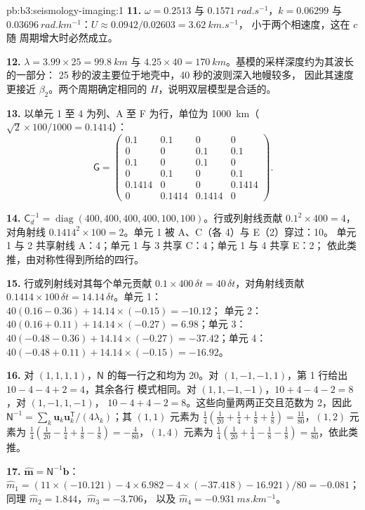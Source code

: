 \begin{solution}{pb:b3:seismology-imaging:1}
\textbf{11.} $\omega = 0.2513$ 与 $\qty{0.1571}{rad.s^{-1}}$，$k = 0.06299$ 与
$\qty{0.03696}{rad.km^{-1}}$：$U \approx 0.0942/0.02603 = \qty{3.62}{km.s^{-1}}$，
小于两个相速度，这在 $c$ 随
周期增大时必然成立。

\textbf{12.} $\lambda = 3.99\times25 = \qty{99.8}{km}$ 与 $4.25\times40 =
\qty{170}{km}$。基模的采样深度约为其波长的一部分：
25 秒的波主要位于地壳中，40 秒的波则深入地幔较多，
因此其速度更接近 $\beta_2$。两个周期确定相同的
$H$，说明双层模型是合适的。

\textbf{13.} 以单元 1 至 4 为列、A 至 F 为行，单位为
\qty{1000}{km}（$\sqrt2\times100/1000 = 0.1414$）：
\[
  \mathsf G = \begin{pmatrix}
  0.1 & 0.1 & 0 & 0 \\ 0 & 0 & 0.1 & 0.1 \\ 0.1 & 0 & 0.1 & 0 \\
  0 & 0.1 & 0 & 0.1 \\ 0.1414 & 0 & 0 & 0.1414 \\ 0 & 0.1414 & 0.1414 & 0
  \end{pmatrix}.
\]

\textbf{14.} $\mathsf C_d^{-1} = \operatorname{diag}(400, 400, 400, 400, 100,
100)$。行或列射线贡献 $0.1^2\times400 = 4$，对角射线
$0.1414^2\times100 = 2$。单元 1 被 A、C（各 4）与 E（2）穿过：10。
单元 1 与 2 共享射线 A：4；单元 1 与 3 共享 C：4；单元 1 与 4 共享 E：2；
依此类推，由对称性得到所给的四行。

\textbf{15.} 行或列射线对其每个单元贡献 $0.1\times400\,\delta t = 40\,
\delta t$，对角射线贡献 $0.1414\times100\,\delta t =
14.14\,\delta t$。单元 1：$40(0.16 - 0.36) + 14.14\times(-0.15) = -10.12$；
单元 2：$40(0.16 + 0.11) + 14.14\times(-0.27) = 6.98$；单元 3：$40(-0.48 - 0.36) +
14.14\times(-0.27) = -37.42$；单元 4：$40(-0.48 + 0.11) + 14.14\times(-0.15) =
-16.92$。

\textbf{16.} 对 $(1,1,1,1)$，$\mathsf N$ 的每一行之和均为 20。对
$(1,-1,-1,1)$，第 1 行给出 $10 - 4 - 4 + 2 = 4$，其余各行
模式相同。对 $(1,1,-1,-1)$，$10 + 4 - 4 - 2 = 8$，对 $(1,-1,1,-1)$，
$10 - 4 + 4 - 2 = 8$。这些向量两两正交且范数为 2，因此
$\mathsf N^{-1} = \sum_k \mathbf u_k\mathbf u_k^{\mathsf T}/(4\lambda_k)$；其
$(1,1)$ 元素为 $\tfrac14(\tfrac1{20} + \tfrac14 + \tfrac18 + \tfrac18) =
\tfrac{11}{80}$，$(1,2)$ 元素为 $\tfrac14(\tfrac1{20} - \tfrac14 + \tfrac18
- \tfrac18) = -\tfrac4{80}$，$(1,4)$ 元素为 $\tfrac14(\tfrac1{20} +
\tfrac14 - \tfrac18 - \tfrac18) = \tfrac1{80}$，依此类推。

\textbf{17.} $\hat{\mathbf m} = \mathsf N^{-1}\mathbf b$：
$\hat m_1 = (11\times(-10.121) - 4\times6.982 - 4\times(-37.418) - 16.921)/80
= -0.081$；同理 $\hat m_2 = 1.844$，$\hat m_3 = -3.706$，
以及 $\hat m_4 = \qty{-0.931}{ms.km^{-1}}$。


\end{solution}
